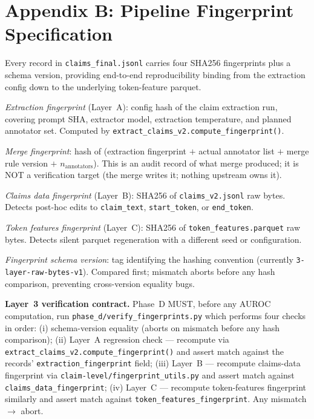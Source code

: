\documentclass[runningheads]{llncs}
\begin{document}
\section*{Appendix B: Pipeline Fingerprint Specification}

Every record in \texttt{claims\_final.jsonl} carries four SHA256 fingerprints
plus a schema version, providing end-to-end reproducibility binding from the
extraction config down to the underlying token-feature parquet.

\textit{Extraction fingerprint} (Layer~A): config hash of the claim extraction
run, covering prompt SHA, extractor model, extraction temperature, and planned
annotator set. Computed by \texttt{extract\_claims\_v2.compute\_fingerprint()}.

\textit{Merge fingerprint}: hash of (extraction fingerprint $+$ actual
annotator list $+$ merge rule version $+$ $n_{\text{annotators}}$).
This is an audit record of what merge produced; it is NOT a verification
target (the merge writes it; nothing upstream owns it).

\textit{Claims data fingerprint} (Layer~B): SHA256 of \texttt{claims\_v2.jsonl}
raw bytes. Detects post-hoc edits to \texttt{claim\_text},
\texttt{start\_token}, or \texttt{end\_token}.

\textit{Token features fingerprint} (Layer~C): SHA256 of
\texttt{token\_features.parquet} raw bytes. Detects silent parquet
regeneration with a different seed or configuration.

\textit{Fingerprint schema version}: tag identifying the hashing convention
(currently \texttt{3-layer-raw-bytes-v1}). Compared first; mismatch aborts
before any hash comparison, preventing cross-version equality bugs.

\textbf{Layer~3 verification contract.} Phase~D MUST, before any AUROC
computation, run \texttt{phase\_d/verify\_fingerprints.py} which performs
four checks in order: (i) schema-version equality (aborts on mismatch
before any hash comparison); (ii) Layer~A regression check --- recompute
via \texttt{extract\_claims\_v2.compute\_fingerprint()} and assert match
against the records' \texttt{extraction\_fingerprint} field; (iii) Layer~B
--- recompute claims-data fingerprint via
\texttt{claim-level/fingerprint\_utils.py} and assert match against
\texttt{claims\_data\_fingerprint}; (iv) Layer~C --- recompute
token-features fingerprint similarly and assert match against
\texttt{token\_features\_fingerprint}. Any mismatch $\to$ abort.



\end{document}
